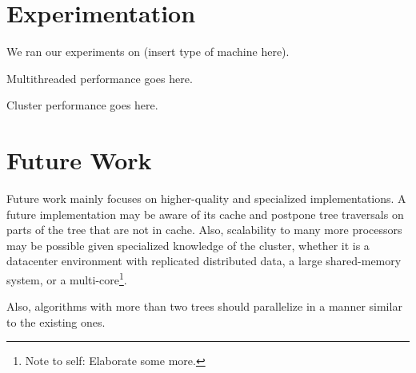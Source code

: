 \documentclass[times, leqno,twocolumn]{article}
\newcommand{\authornote}[1]{\footnote{Note to self: #1}}
\newcommand{\authorsnote}[1]{\authornote{#1}}
\begin{document}
\section{Experimentation}

We ran our experiments on (insert type of machine here).

Multithreaded performance goes here.

Cluster performance goes here.

\section{Future Work}

Future work mainly focuses on higher-quality and specialized implementations.
A future implementation may be aware of its cache and postpone tree traversals on parts of the tree that are not in cache.
Also, scalability to many more processors may be possible given specialized knowledge of the cluster, whether it is a datacenter environment with replicated distributed data, a large shared-memory system, or a multi-core\authorsnote{Elaborate some more.}.

Also, algorithms with more than two trees should parallelize in a manner similar to the existing ones.



\end{document}
